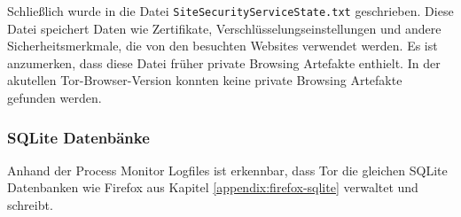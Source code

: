 \begin{appendices}
		Schließlich wurde in die Datei \texttt{SiteSecurityServiceState.txt} geschrieben.
		Diese Datei speichert Daten wie Zertifikate, Verschlüsselungseinstellungen und andere Sicherheitsmerkmale, die von den besuchten Websites verwendet werden.
		Es ist anzumerken, dass diese Datei früher private Browsing Artefakte enthielt. \cite{Gitlab.05.06.2023} In der akutellen Tor-Browser-Version konnten keine private Browsing Artefakte gefunden werden.
		
		\subsubsection*{SQLite Datenbänke} 
		Anhand der Process Monitor Logfiles ist erkennbar, dass Tor die gleichen SQLite Datenbanken wie Firefox aus Kapitel \ref{appendix:firefox-sqlite} verwaltet und schreibt.
		

\end{appendices}
